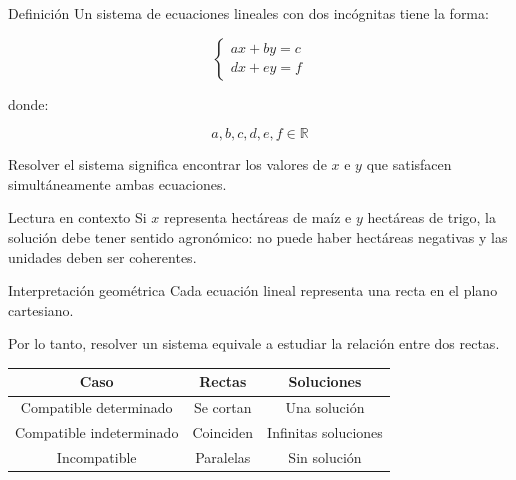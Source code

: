 \documentclass[aspectratio=169]{beamer}
\begin{document}
\begin{frame}{Definición}
	Un sistema de ecuaciones lineales con dos incógnitas tiene la forma:
	
	\[
	\begin{cases}
		ax+by=c\\
		dx+ey=f
	\end{cases}
	\]
	
	donde:
	
	\[
	a,b,c,d,e,f\in\mathbb{R}
	\]
	
	\bigskip
	
	Resolver el sistema significa encontrar los valores de \(x\) e \(y\) que satisfacen simultáneamente ambas ecuaciones.
	
	\bigskip
	
	\begin{block}{Lectura en contexto}
		Si \(x\) representa hectáreas de maíz e \(y\) hectáreas de trigo, la solución debe tener sentido agronómico: no puede haber hectáreas negativas y las unidades deben ser coherentes.
	\end{block}
\end{frame}
	
\begin{frame}{Interpretación geométrica}
	Cada ecuación lineal representa una recta en el plano cartesiano.
	
	\bigskip
	
	Por lo tanto, resolver un sistema equivale a estudiar la relación entre dos rectas.
	
	\bigskip
	
	\begin{center}
		\begin{tabular}{|c|c|c|}
			\hline
			\textbf{Caso} & \textbf{Rectas} & \textbf{Soluciones} \\
			\hline
			Compatible determinado & Se cortan & Una solución \\
			\hline
			Compatible indeterminado & Coinciden & Infinitas soluciones \\
			\hline
			Incompatible & Paralelas & Sin solución \\
			\hline
		\end{tabular}
	\end{center}
\end{frame}
	
\end{document}
